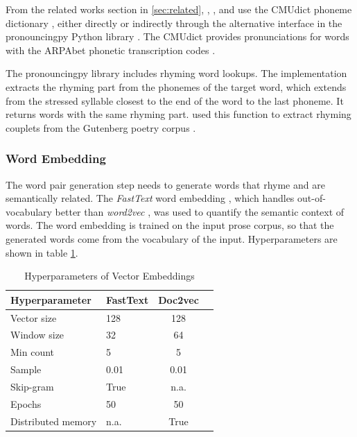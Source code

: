 \documentclass[11pt,a4paper]{article}
\begin{document}
From the related works section in \ref{sec:related}, \citet{keswarani}, \citet{cole}, and \citet{hopkins-kiela-2017} use the CMUdict phoneme dictionary \cite{cmudict}, either directly or indirectly through the alternative interface in the pronouncingpy Python library \cite{pronouncingpy}. The CMUdict provides pronunciations for words with the ARPAbet phonetic transcription codes \cite[Chapter~27]{jurafsky}.

The pronouncingpy library includes rhyming word lookups. The implementation extracts the rhyming part from the phonemes of the target word, which extends from the stressed syllable closest to the end of the word to the last phoneme. It returns words with the same rhyming part. \citet{cole} used this function to extract rhyming couplets from the Gutenberg poetry corpus \cite{gutenbergpoetry}.

\subsubsection{Word Embedding}
\label{sec:fasttext}

The word pair generation step needs to generate words that rhyme and are semantically related. The \textit{FastText} word embedding \cite{fasttext}, which handles out-of-vocabulary better than \textit{word2vec} \cite{wordvec}, was used to quantify the semantic context of words. The word embedding is trained on the input prose corpus, so that the generated words come from the vocabulary of the input. Hyperparameters are shown in table \ref{table:HP_fasttext}.

\begin{table}[ht]
\centering
\begin{tabular}{ll c c}
	\hline\hline
	Hyperparameter & FastText & Doc2vec \\ [0.5ex]
	\hline\hline
	Vector size & 128 & 128 \\ [0.5ex]
	Window size & 32 & 64 \\ [0.5ex]
	Min count & 5 & 5 \\ [0.5ex]
	Sample & 0.01 & 0.01 \\ [0.5ex]
	Skip-gram & True & n.a. \\ [0.5ex]
	Epochs & 50 & 50 \\ [0.5ex]
	Distributed memory & n.a. & True \\ [0.5ex]
	\hline
\end{tabular}
\caption{Hyperparameters of Vector Embeddings}
\label{table:HP_fasttext}
\end{table}
\end{document}
